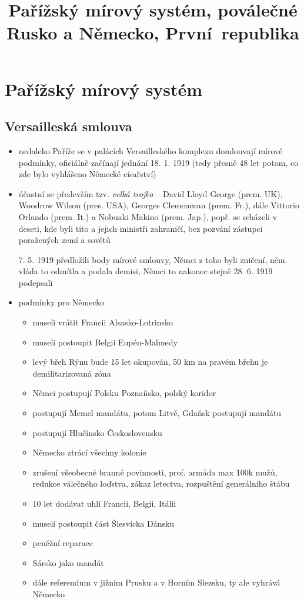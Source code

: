 \documentclass{article}
\title{\vspace{-2cm}Pařížský mírový systém, poválečné Rusko a Německo, První~republika\vspace{-1.7cm}}
\date{}
\author{}
\begin{document}
\maketitle

\section*{Pařížský mírový systém}

\subsection*{Versailleská smlouva}
\begin{itemize}
  \item nedaleko Paříže se v palácích Versailleského komplexu domlouvají mírové podmínky, oficiálně začínají jednání 18. 1. 1919 (tedy přesně 48 let potom, co zde bylo vyhlášeno Německé císařství)
  \item účastní se především tzv. \textit{velká trojka} -- David Lloyd George (prem. UK), Woodrow Wilson (pres. USA), Georges Clemenceau (prem. Fr.), dále Vittorio Orlando (prem. It.) a Nobuaki Makino (prem. Jap.), popř. se scházeli v deseti, kde byli tito a jejich ministři zahraničí, bez pozvání zástupci poražených zemí a sovětů
  \item[7. 5. 1919] předložili body mírové smlouvy, Němci z toho byli zničení, něm. vláda to odmítla a podala demisi, Němci to nakonec stejně 28. 6. 1919 podepsali
  \item podmínky pro Německo
  \begin{itemize}
    \item museli vrátit Francii Alsasko-Lotrinsko
    \item museli postoupit Belgii Eupén-Malmedy
    \item levý břeh Rýnu bude 15 let okupován, 50 km na pravém břehu je demilitarizovaná zóna
    \item Němci postupují Polsku Poznaňsko, polský koridor
    \item postupují Memel mandátu, potom Litvě, Gdaňsk postupují mandátu
    \item postupují Hlučínsko Československu
    \item Německo ztrácí všechny kolonie
    \item zrušení všeobecné branné povinnosti, prof. armáda max 100k mužů, redukce válečného loďstva, zákaz letectva, rozpuštění generálního štábu
    \item 10 let dodávat uhlí Francii, Belgii, Itálii
    \item museli postoupit část Šlesvicka Dánsku
    \item peněžní reparace
    \item Sársko jako mandát
    \item dále referendum v jižním Prusku a v Horním Slezsku, ty ale vyhrává Německo
  \end{itemize}
\end{itemize}
\end{document}
